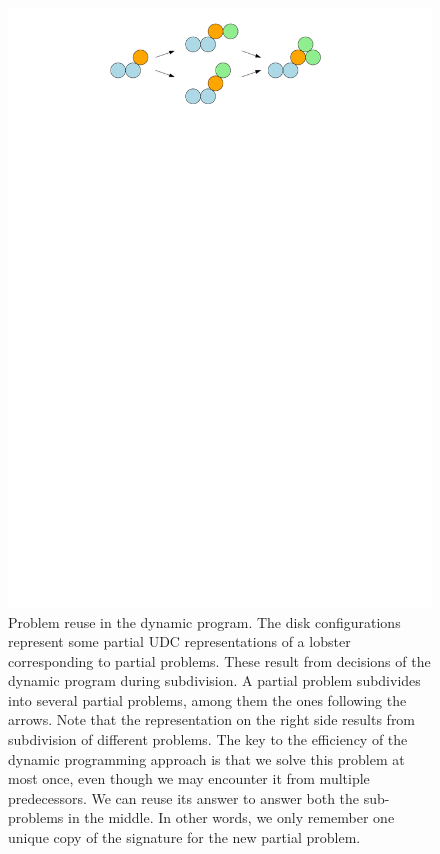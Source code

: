 \begin{figure}
    \centering
    \includegraphics{graphics/ch4_reuse.pdf}
    \caption{Problem reuse in the dynamic program. The disk configurations represent some partial UDC representations of a lobster corresponding to partial problems. These result from decisions of the dynamic program during subdivision. A partial problem subdivides into several partial problems, among them the ones following the arrows.
    Note that the representation on the right side results from subdivision of different problems. The key to the efficiency of the dynamic programming approach is that we solve this problem at most once, even though we may encounter it from multiple predecessors. We can reuse its answer to answer both the sub-problems in the middle.
    In other words, we only remember one unique copy of the signature for the new partial problem.
    }
    \label{fig:ch4_reuse}
\end{figure}

